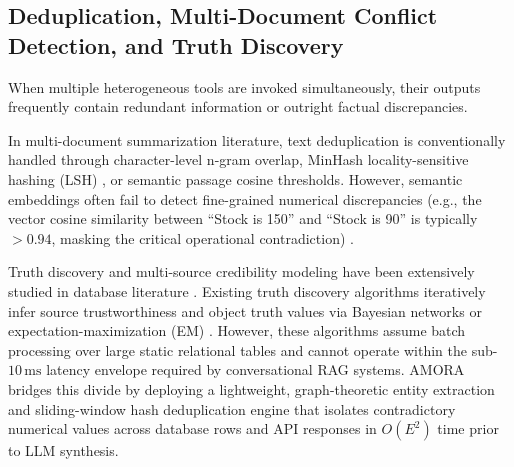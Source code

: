 \subsection{Deduplication, Multi-Document Conflict Detection, and Truth Discovery}
When multiple heterogeneous tools are invoked simultaneously, their outputs frequently contain redundant information or outright factual discrepancies.

In multi-document summarization literature, text deduplication is conventionally handled through character-level n-gram overlap, MinHash locality-sensitive hashing (LSH) \cite{broder1997minhash}, or semantic passage cosine thresholds. However, semantic embeddings often fail to detect fine-grained numerical discrepancies (e.g., the vector cosine similarity between ``Stock is 150'' and ``Stock is 90'' is typically $>0.94$, masking the critical operational contradiction) \cite{min2023factscore}.

Truth discovery and multi-source credibility modeling have been extensively studied in database literature \cite{li2014resolving,zheng2017truth}. Existing truth discovery algorithms iteratively infer source trustworthiness and object truth values via Bayesian networks or expectation-maximization (EM) \cite{dawid1979maximum}. However, these algorithms assume batch processing over large static relational tables and cannot operate within the sub-$10\,\text{ms}$ latency envelope required by conversational RAG systems. AMORA bridges this divide by deploying a lightweight, graph-theoretic entity extraction and sliding-window hash deduplication engine that isolates contradictory numerical values across database rows and API responses in $O(E^2)$ time prior to LLM synthesis.

